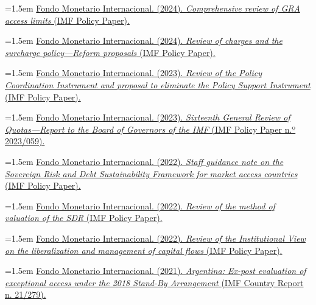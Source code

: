 \documentclass[10pt,a4paper]{article}
\begin{document}
\noindent\hangindent=1.5em \href{https://www.imf.org/en/publications/policy-papers/issues/2024/12/23/comprehensive-review-of-gra-access-limits-559998}{Fondo Monetario Internacional. (2024). \textit{Comprehensive review of GRA access limits} (IMF Policy Paper).}

\noindent\hangindent=1.5em \href{https://www.imf.org/en/Publications/Policy-Papers/Issues/2024/10/21/Review-Of-Charges-And-The-Surcharge-Policy-Reform-Proposals-556499}{Fondo Monetario Internacional. (2024). \textit{Review of charges and the surcharge policy---Reform proposals} (IMF Policy Paper).}

\noindent\hangindent=1.5em \href{https://www.imf.org/en/Publications/Policy-Papers/Issues/2023/10/06/Review-of-the-Policy-Coordination-Instrument-and-Proposal-to-Eliminate-the-Policy-Support-540139}{Fondo Monetario Internacional. (2023). \textit{Review of the Policy Coordination Instrument and proposal to eliminate the Policy Support Instrument} (IMF Policy Paper).}

\noindent\hangindent=1.5em \href{https://www.imf.org/-/media/files/publications/pp/2023/english/ppea2023059.pdf}{Fondo Monetario Internacional. (2023). \textit{Sixteenth General Review of Quotas---Report to the Board of Governors of the IMF} (IMF Policy Paper n.º 2023/059).}

\noindent\hangindent=1.5em \href{https://www.imf.org/en/publications/dsa/sovereign-risk-and-debt-sustainability-analysis-for-market-access-countries}{Fondo Monetario Internacional. (2022). \textit{Staff guidance note on the Sovereign Risk and Debt Sustainability Framework for market access countries} (IMF Policy Paper).}

\noindent\hangindent=1.5em \href{https://www.imf.org/en/Publications/Policy-Papers/Issues/2022/05/16/Review-of-the-Method-of-Valuation-of-the-SDR-517967}{Fondo Monetario Internacional. (2022). \textit{Review of the method of valuation of the SDR} (IMF Policy Paper).}

\noindent\hangindent=1.5em \href{https://www.imf.org/en/Topics/Capital-Flows}{Fondo Monetario Internacional. (2022). \textit{Review of the Institutional View on the liberalization and management of capital flows} (IMF Policy Paper).}

\noindent\hangindent=1.5em \href{https://www.imf.org/-/media/files/publications/cr/2021/english/1argea2021001.pdf}{Fondo Monetario Internacional. (2021). \textit{Argentina: Ex-post evaluation of exceptional access under the 2018 Stand-By Arrangement} (IMF Country Report n.\textordmasculine{} 21/279).}
\end{document}

